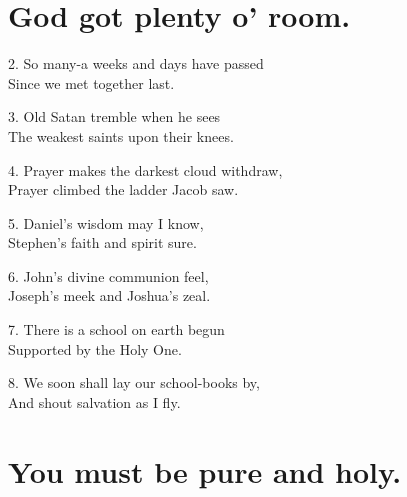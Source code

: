 \documentclass[a5paper,10pt]{book}
\begin{document}
\newpage
\section{God got plenty o' room.}
\thispagestyle{empty}

\begin{song}
\end{song}

\begin{stanza}
\setlength{\itemsep}{1pt}
\setlength{\parskip}{0pt}
\item[2.]
  So many-a weeks and days have passed\\
  Since we met together last.
\item[3.]
  Old Satan tremble when he sees\\
  The weakest saints upon their knees.
\item[4.]
  Prayer makes the darkest cloud withdraw,\\
  Prayer climbed the ladder Jacob saw.
\item[5.]
  Daniel's wisdom may I know,\\
  Stephen's faith and spirit sure.
\item[6.]
  John's divine communion feel,\\
  Joseph's meek and Joshua's zeal.
\item[7.]
  There is a school on earth begun\\
  Supported by the Holy One.
\item[8.]
  We soon shall lay our school-books by,\\
  And shout salvation as I fly.
\end{stanza}

\begin{extra}
\end{extra}

\newpage
\section{You must be pure and holy.}
\thispagestyle{empty}
\end{document}
